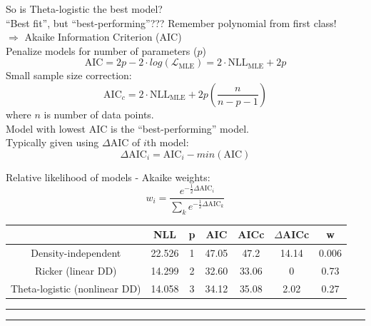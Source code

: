 \documentclass{article}
\newcommand{\ind}{\-\hspace{1cm}}
\begin{document}
So is Theta-logistic the best model?\\
\ind ``Best fit'', but ``best-performing''???  Remember polynomial from first class!\\

$\Rightarrow$ Akaike Information Criterion (AIC)\\
\ind Penalize models for number of parameters ($p$)
\begin{equation*}
	\text{AIC} = 2p - 2\cdot log(\mathcal{L}_{\text{MLE}}) = 2 \cdot \text{NLL}_{\text{MLE}} + 2p
\end{equation*}
Small sample size correction:
\begin{equation*}
	\text{AIC}_c = 2 \cdot \text{NLL}_{\text{MLE}} + 2p \left(\frac{n}{n-p-1}\right)
\end{equation*}
\ind where $n$ is number of data points.\\

Model with lowest AIC is the ``best-performing'' model.\\
Typically given using $\Delta$AIC of $i$th model:
\begin{equation*}
\Delta \text{AIC}_i = \text{AIC}_i - min(\text{AIC})
\end{equation*}

Relative likelihood of models - Akaike weights:\\
\begin{equation*}
	w_i = \frac{e^{-\frac{1}{2} \Delta \text{AIC}_i}}{\sum_k e^{-\frac{1}{2} \Delta \text{AIC}_k}}
\end{equation*}

\begin{tabular}{|c|c|c|c|c|c|c|}
\hline
   & NLL & p & AIC & AICc & $\Delta$AICc & w \\ 
 \hline
Density-independent & 22.526 & 1 & 47.05 & 47.2 & 14.14 & 0.006 \\ 
Ricker (linear DD) & 14.299 & 2 & 32.60 & 33.06 & 0 & 0.73 \\
Theta-logistic (nonlinear DD) & 14.058 & 3 & 34.12 & 35.08 & 2.02 & 0.27\\
\hline
\end{tabular}







\rule[0.5ex]{\linewidth}{1pt}
\rule[0.5ex]{\linewidth}{1pt}
\end{document}
